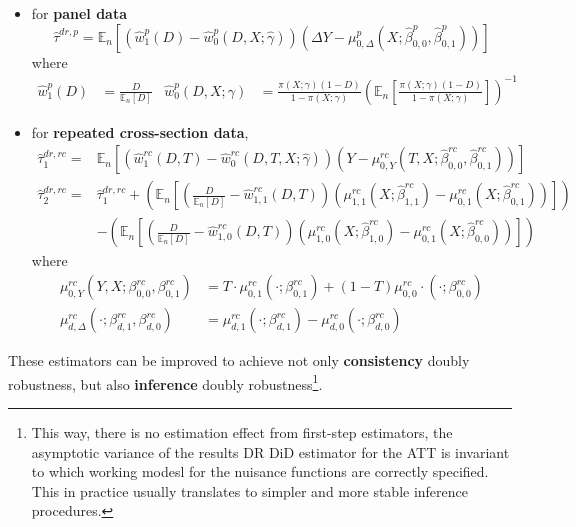 \documentclass[twoside]{article}
\begin{document}
\begin{itemize}
    \item for \textbf{panel data}
    \begin{equation*}
        \hat{\tau}^{dr,p} = \mathbb{E}_n\left[\left(\hat{w}^p_1(D)-\hat{w}^p_0\left(D,X;\hat{\gamma}\right)\right) \left(\Delta Y- \mu^p_{0,\Delta}\left(X;\hat{\beta}^p_{0,0},\hat{\beta}^p_{0,1}\right)\right) \right]
    \end{equation*}
    where 
    \begin{align*}
        \hat{w}^p_1(D)&=\frac{D}{\mathbb{E}_n[D]} & \hat{w}^p_0\left(D,X;\gamma\right)&= \frac{\pi(X;\gamma)(1-D)}{1-\pi(X;\gamma)} \left(\mathbb{E}_n\left[\frac{\pi(X;\gamma)(1-D)}{1-\pi(X;\gamma)}\right]\right)^{-1}
    \end{align*}
    \item for \textbf{repeated cross-section data},
    \begin{align*}
        \hat{\tau}^{dr,rc}_1 =& \mathbb{E}_n \left[ \left(\hat{w}^{rc}_1(D,T) - \hat{w}_0^{rc}(D,T,X;\hat{\gamma}) \right) \left(Y-\mu^{rc}_{0,Y}\left(T,X;\hat{\beta}^{rc}_{0,0},\hat{\beta}^{rc}_{0,1}\right)\right) \right] \\
        \hat{\tau}^{dr,rc}_2 =& \hat{\tau}_1^{dr,rc} + \left(\mathbb{E}_n \left[ \left( \frac{D}{\mathbb{E}_n[D]} -\hat{w}^{rc}_{1,1}(D,T) \right) \left(\mu^{rc}_{1,1}\left(X;\hat{\beta}^{rc}_{1,1}\right) - \mu^{rc}_{0,1}\left(X;\hat{\beta}^{rc}_{0,1}\right)\right) \right]\right) \\
        & - \left(\mathbb{E}_n \left[ \left( \frac{D}{\mathbb{E}_n[D]} -\hat{w}^{rc}_{1,0}(D,T) \right) \left(\mu^{rc}_{1,0}\left(X;\hat{\beta}^{rc}_{1,0}\right) - \mu^{rc}_{0,1}\left(X;\hat{\beta}^{rc}_{0,0}\right)\right) \right]\right)
    \end{align*}
    where
    \begin{align*}
        \mu^{rc}_{0,Y}\left(Y,X;\beta^{rc}_{0,0},\beta^{rc}_{0,1}\right) &= T\cdot \mu^{rc}_{0,1}\left(\cdot;\beta^{rc}_{0,1}\right)+(1-T)\mu^{rc}_{0,0}\cdot \left(\cdot; \beta^{rc}_{0,0}\right) \\
        \mu^{rc}_{d,\Delta}\left(\cdot;\beta^{rc}_{d,1},\beta^{rc}_{d,0}\right) &= \mu^{rc}_{d,1}\left(\cdot;\beta^{rc}_{d,1}\right) - \mu^{rc}_{d,0}\left(\cdot;\beta^{rc}_{d,0}\right)
    \end{align*}
\end{itemize}
These estimators can be improved to achieve not only \textbf{consistency} doubly robustness, but also \textbf{inference} doubly robustness\footnote{This way, there is no estimation effect from first-step estimators, the asymptotic variance of the results DR DiD estimator for the ATT is invariant to which working modesl for the nuisance functions are correctly specified. This in practice usually translates to simpler and more stable inference procedures.}. 
\end{document}
